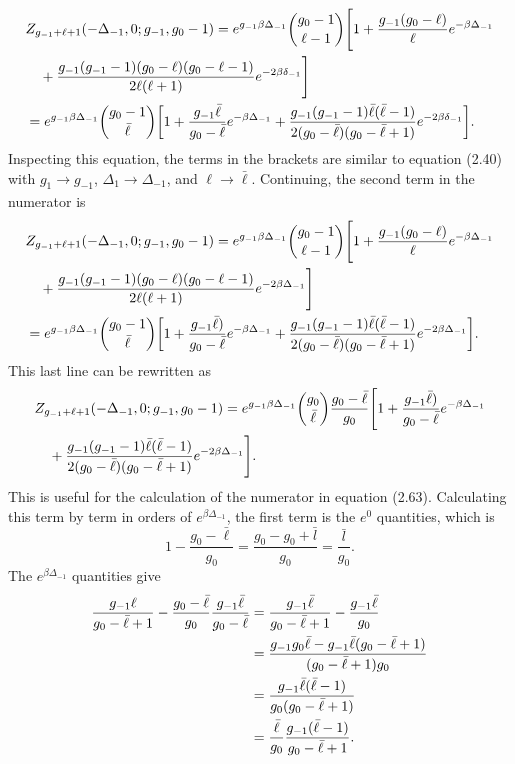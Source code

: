 \begin{align}
    &Z_{g_{-1}+\ell+1}(-\Delta_{-1},0;g_{-1},g_0-1)=e^{g_{-1}\beta\Delta_{-1}}{g_0-1 \choose \ell-1}\Biggr[1+\frac{g_{-1}(g_0-\ell)}{\ell}e^{-\beta\Delta_{-1}}\nonumber\\
    &\quad+\frac{g_{-1}(g_{-1}-1)(g_0-\ell)(g_0-\ell-1)}{2\ell(\ell+1)}e^{-2\beta\delta_{-1}}\Biggr]\nonumber\\
    &=e^{g_{-1}\beta\Delta_{-1}}{g_0-1 \choose \Bar{\ell}}\qty[1+\frac{g_{-1}\Bar{\ell}}{g_0-\bar{\ell}}e^{-\beta\Delta_{-1}}+\frac{g_{-1}(g_{-1}-1)\Bar{\ell}(\Bar{\ell}-1)}{2(g_0-\Bar{\ell})(g_0-\Bar{\ell}+1)}e^{-2\beta\delta_{-1}}].
\end{align}
Inspecting this equation, the terms in the brackets are similar to equation (2.40) with $g_1\xrightarrow[]{}g_{-1}$, $\Delta_1\xrightarrow[]{}\Delta_{-1}$, and $\ell \xrightarrow[]{}\bar{\ell}$. Continuing, the second term in the numerator is
\begin{align}
    &Z_{g_{-1}+\ell+1}(-\Delta_{-1},0;g_{-1},g_0-1)=e^{g_{-1}\beta\Delta_{-1}}{g_0-1\choose \ell-1}\Biggr[1+\frac{g_{-1}(g_0-\ell)}{\ell}e^{-\beta\Delta_{-1}}\nonumber\\
    &\quad+\frac{g_{-1}(g_{-1}-1)(g_0-\ell)(g_0-\ell-1)}{2\ell(\ell+1)}e^{-2\beta\Delta_{-1}}\Biggr]\nonumber\\
    &=e^{g_{-1}\beta\Delta_{-1}}{g_0-1\choose \Bar{\ell}} \qty[1+\frac{g_{-1}\Bar{\ell})}{g_0-\Bar{\ell}}e^{-\beta\Delta_{-1}}+\frac{g_{-1}(g_{-1}-1)\Bar{\ell}(\Bar{\ell}-1)}{2(g_0-\Bar{\ell})(g_0-\Bar{\ell}+1)}e^{-2\beta\Delta_{-1}}].
\end{align}
This last line can be rewritten as 
\begin{align}
    &Z_{g_{-1}+\ell+1}(-\Delta_{-1},0;g_{-1},g_0-1)=e^{g_{-1}\beta\Delta_{-1}}{g_0\choose \Bar{\ell}} \frac{g_0-\bar{\ell}}{g_0} \Biggr[1+\frac{g_{-1}\Bar{\ell})}{g_0-\Bar{\ell}}e^{-\beta\Delta_{-1}}\nonumber\\
    &\quad+\frac{g_{-1}(g_{-1}-1)\Bar{\ell}(\Bar{\ell}-1)}{2(g_0-\Bar{\ell})(g_0-\Bar{\ell}+1)}e^{-2\beta\Delta_{-1}}\Biggr].
\end{align}
This is useful for the calculation of the numerator in equation (2.63). Calculating this term by term in orders of $e^{\beta\Delta_{-1}}$, the first term is the $e^0$ quantities, which is 
\begin{equation}
    1-\frac{g_0-\bar{\ell}}{g_0}=\frac{g_0-g_0+\bar{l}}{g_0}=\frac{\bar{l}}{g_0}.
\end{equation}
The $e^{\beta\Delta_{-1}}$ quantities give
\begin{align}
    \frac{g_{-1}\ell}{g_0-\Bar{\ell}+1}-\frac{g_0-\Bar{\ell}}{g_0}\frac{g_{-1}\bar{\ell}}{g_0-\bar{\ell}}&=\frac{g_{-1}\bar{\ell}}{g_0-\bar{\ell}+1}-\frac{g_{-1}\bar{\ell}}{g_0}\nonumber\\
    &=\frac{g_{-1}g_0\bar{\ell}-g_{-1}\bar{\ell}(g_0-\bar{\ell}+1)}{(g_0-\bar{\ell}+1)g_0}\nonumber\\
    &=\frac{g_{-1}\bar{\ell}(\bar{\ell}-1)}{g_0(g_0-\bar{\ell}+1)}\nonumber\\
    &=\frac{\bar{\ell}}{g_0} \frac{g_{-1}(\bar{\ell}-1)}{g_0-\bar{\ell}+1}.
\end{align}
